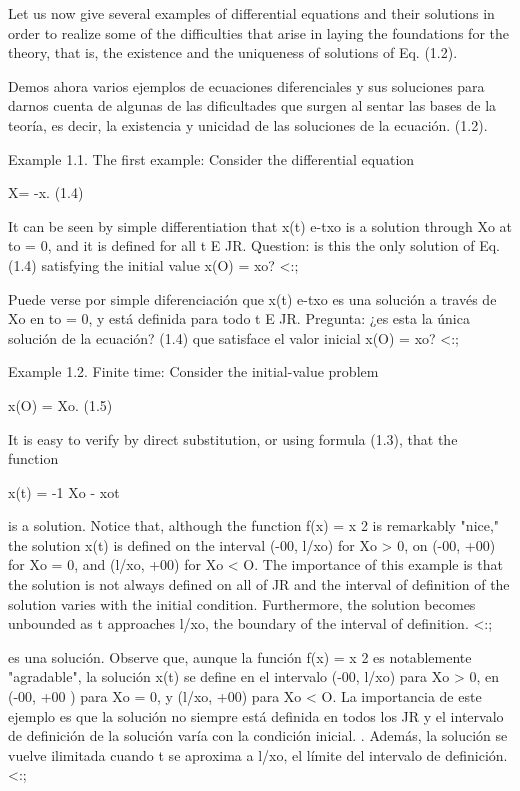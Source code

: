 \documentclass[]{article}
\begin{document}
Let us now give several examples of differential equations and their solutions in order to realize some of the difficulties that arise in laying the foundations for the theory, that is, the existence and the uniqueness of solutions of Eq. (1.2).

Demos ahora varios ejemplos de ecuaciones diferenciales y sus soluciones para darnos cuenta de algunas de las dificultades que surgen al sentar las bases de la teoría, es decir, la existencia y unicidad de las soluciones de la ecuación. (1.2).

Example 1.1. The first example: Consider the differential equation

X= -x. (1.4)

It can be seen by simple differentiation that x(t) e-txo is a solution through Xo at to = 0, and it is defined for all t E JR. Question: is this the only solution of Eq. (1.4) satisfying the initial value x(O) = xo? <:;

Puede verse por simple diferenciación que x(t) e-txo es una solución a través de Xo en to = 0, y está definida para todo t E JR. Pregunta: ¿es esta la única solución de la ecuación? (1.4) que satisface el valor inicial x(O) = xo? <:;

Example 1.2. Finite time: Consider the initial-value problem

x(O) = Xo. (1.5)

It is easy to verify by direct substitution, or using formula (1.3), that the function

x(t) = -1 Xo
- xot

is a solution. Notice that, although the function f(x) = x 2 is remarkably "nice," the solution x(t) is defined on the interval (-00, l/xo) for Xo > 0, on (-00, +00) for Xo = 0, and (l/xo, +00) for Xo < O. The importance of this example is that the solution is not always defined on all of JR and the interval of definition of the solution varies with the initial condition. Furthermore, the solution becomes unbounded as t approaches l/xo, the boundary of the interval of definition. <:;

es una solución. Observe que, aunque la función f(x) = x 2 es notablemente "agradable", la solución x(t) se define en el intervalo (-00, l/xo) para Xo > 0, en (-00, +00 ) para Xo = 0, y (l/xo, +00) para Xo < O. La importancia de este ejemplo es que la solución no siempre está definida en todos los JR y el intervalo de definición de la solución varía con la condición inicial. . Además, la solución se vuelve ilimitada cuando t se aproxima a l/xo, el límite del intervalo de definición. <:;
\end{document}
